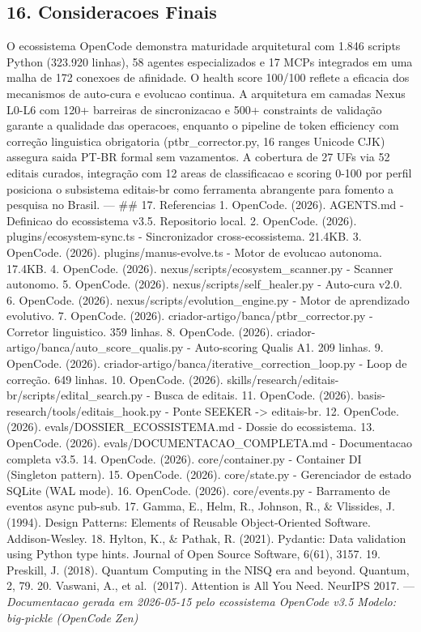 \documentclass[
  12pt,
]{article}
\begin{document}
\subsection{16. Consideracoes Finais}\label{consideracoes-finais}

O ecossistema OpenCode demonstra maturidade arquitetural com 1.846
scripts Python (323.920 linhas), 58 agentes especializados e 17 MCPs
integrados em uma malha de 172 conexoes de afinidade. O health score
100/100 reflete a eficacia dos mecanismos de auto-cura e evolucao
continua. A arquitetura em camadas Nexus L0-L6 com 120+ barreiras de
sincronizacao e 500+ constraints de validação garante a qualidade das
operacoes, enquanto o pipeline de token efficiency com correção
linguistica obrigatoria (ptbr\_corrector.py, 16 ranges Unicode CJK)
assegura saida PT-BR formal sem vazamentos. A cobertura de 27 UFs via 52
editais curados, integração com 12 areas de classificacao e scoring
0-100 por perfil posiciona o subsistema editais-br como ferramenta
abrangente para fomento a pesquisa no Brasil. --- \#\# 17. Referencias
1. OpenCode. (2026). AGENTS.md - Definicao do ecossistema v3.5.
Repositorio local. 2. OpenCode. (2026). plugins/ecosystem-sync.ts -
Sincronizador cross-ecossistema. 21.4KB. 3. OpenCode. (2026).
plugins/manus-evolve.ts - Motor de evolucao autonoma. 17.4KB. 4.
OpenCode. (2026). nexus/scripts/ecosystem\_scanner.py - Scanner
autonomo. 5. OpenCode. (2026). nexus/scripts/self\_healer.py - Auto-cura
v2.0. 6. OpenCode. (2026). nexus/scripts/evolution\_engine.py - Motor de
aprendizado evolutivo. 7. OpenCode. (2026).
criador-artigo/banca/ptbr\_corrector.py - Corretor linguistico. 359
linhas. 8. OpenCode. (2026). criador-artigo/banca/auto\_score\_qualis.py
- Auto-scoring Qualis A1. 209 linhas. 9. OpenCode. (2026).
criador-artigo/banca/iterative\_correction\_loop.py - Loop de correção.
649 linhas. 10. OpenCode. (2026).
skills/research/editais-br/scripts/edital\_search.py - Busca de editais.
11. OpenCode. (2026). basis-research/tools/editais\_hook.py - Ponte
SEEKER -\textgreater{} editais-br. 12. OpenCode. (2026).
evals/DOSSIER\_ECOSSISTEMA.md - Dossie do ecossistema. 13. OpenCode.
(2026). evals/DOCUMENTACAO\_COMPLETA.md - Documentacao completa v3.5.
14. OpenCode. (2026). core/container.py - Container DI (Singleton
pattern). 15. OpenCode. (2026). core/state.py - Gerenciador de estado
SQLite (WAL mode). 16. OpenCode. (2026). core/events.py - Barramento de
eventos async pub-sub. 17. Gamma, E., Helm, R., Johnson, R., \&
Vlissides, J. (1994). Design Patterns: Elements of Reusable
Object-Oriented Software. Addison-Wesley. 18. Hylton, K., \& Pathak, R.
(2021). Pydantic: Data validation using Python type hints. Journal of
Open Source Software, 6(61), 3157. 19. Preskill, J. (2018). Quantum
Computing in the NISQ era and beyond. Quantum, 2, 79. 20. Vaswani, A.,
et al.~(2017). Attention is All You Need. NeurIPS 2017. ---
\emph{Documentacao gerada em 2026-05-15 pelo ecossistema OpenCode v3.5
\textbar{} Modelo: big-pickle (OpenCode Zen)}
\end{document}
